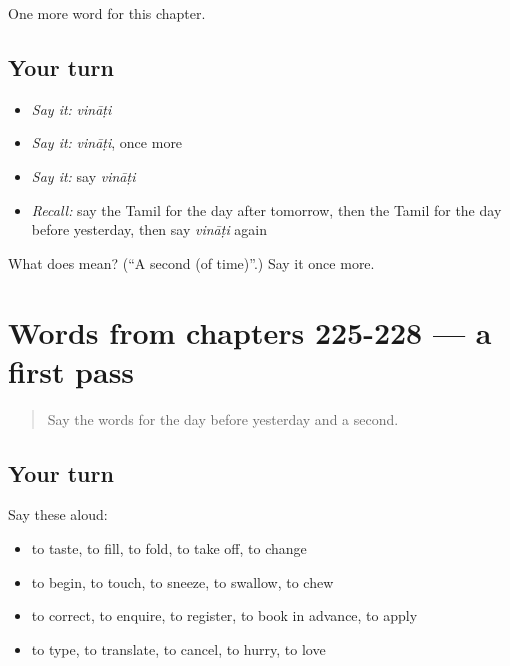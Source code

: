 \begin{grammarlens}[title={What you've built}]
One more word for this chapter.
\end{grammarlens}

\subsection*{Your turn}
\begin{itemize}
\raggedright
  \item \emph{Say it:} \emph{vināṭi}
  \item \emph{Say it:} \emph{vināṭi}, once more
  \item \emph{Say it:} say \emph{vināṭi}
  \item \emph{Recall:} say the Tamil for the day after tomorrow, then the Tamil for the day before yesterday, then say \emph{vināṭi} again
\end{itemize}

\begin{tcolorbox}[breakable,colback=teal!4,colframe=teal!35!black,title={Before you move on}]
What does  mean? (\textquotedblleft{}A second (of time)\textquotedblright{}.) Say it once more.
\end{tcolorbox}
\section[(dialogue)]{Words from chapters 225-228 — a first pass}

\label{lesson:TA-R233-first-pass-words-from-chapters-225-228}



\begin{quote}
Say the words for the day before yesterday and a second.
\end{quote}

\subsection*{Your turn}
Say these aloud:

\begin{itemize}
\raggedright
  \item to taste, to fill, to fold, to take off, to change
  \item to begin, to touch, to sneeze, to swallow, to chew
  \item to correct, to enquire, to register, to book in advance, to apply
  \item to type, to translate, to cancel, to hurry, to love
\end{itemize}

